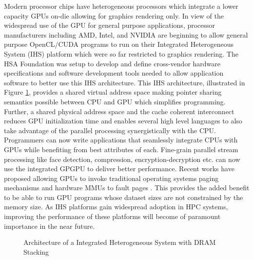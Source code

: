 \par Modern processor chips have heterogeneous processors which integrate a lower capacity GPUs on-die allowing for graphics rendering only. In view of the widespread use of the GPU for general purpose applications, processor manufacturers including AMD\cite{amd-apu}, Intel\cite{inteliris}, and NVIDIA\cite{denver} are beginning to allow general purpose OpenCL\cite{opencl}/CUDA\cite{cuda} programs to run on their Integrated Heterogeneous System (IHS) platform which were so far restricted to graphics rendering. The HSA Foundation \cite{hsafoundation} was setup to develop and define cross-vendor hardware specifications and software development tools needed to allow application software to better use this IHS architecture. This IHS architecture, illustrated in Figure \ref{fig:hsa-arch}, provides a shared virtual address space making pointer sharing semantics possible between CPU and GPU which simplifies programming. Further, a shared physical address space and the cache coherent interconnect reduces GPU initialization time and enables several high level languages \cite{sumatra,julia} to also take advantage of the parallel processing synergistically with the CPU. Programmers can now write applications that seamlessly integrate CPUs with GPUs while benefiting from best attributes of each. Fine-grain parallel stream processing like face detection, compression, encryption-decryption etc. can now use the integrated GPGPU to deliver better performance. Recent works have proposed allowing GPUs to invoke traditional operating systems paging mechanisms and hardware MMUs to fault pages \cite{tlb-translation}. This provides the added benefit to be able to run GPU programs whose dataset sizes are not constrained by the memory size. As IHS platforms gain widespread adoption in HPC systems, improving the performance of these platforms will become of paramount importance in the near future. \cite{apu-exascale,amd-exascale1}

\begin{figure}[!htb]
    \centering
    \hsacpu
    \caption{Architecture of a Integrated Heterogeneous System with DRAM Stacking}
    \label{fig:hsa-arch}
\end{figure}


